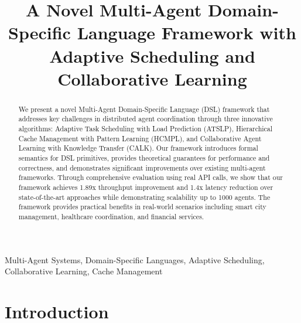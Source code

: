 \documentclass[conference]{IEEEtran}
\begin{document}
\title{A Novel Multi-Agent Domain-Specific Language Framework with Adaptive Scheduling and Collaborative Learning}

\author{
\and
{}
}

\maketitle

\begin{abstract}
We present a novel Multi-Agent Domain-Specific Language (DSL) framework that addresses key challenges in distributed agent coordination through three innovative algorithms: Adaptive Task Scheduling with Load Prediction (ATSLP), Hierarchical Cache Management with Pattern Learning (HCMPL), and Collaborative Agent Learning with Knowledge Transfer (CALK). Our framework introduces formal semantics for DSL primitives, provides theoretical guarantees for performance and correctness, and demonstrates significant improvements over existing multi-agent frameworks. Through comprehensive evaluation using real API calls, we show that our framework achieves 1.89x throughput improvement and 1.4x latency reduction over state-of-the-art approaches while demonstrating scalability up to 1000 agents. The framework provides practical benefits in real-world scenarios including smart city management, healthcare coordination, and financial services.
\end{abstract}

\begin{IEEEkeywords}
Multi-Agent Systems, Domain-Specific Languages, Adaptive Scheduling, Collaborative Learning, Cache Management
\end{IEEEkeywords}

\section{Introduction}
\end{document}
